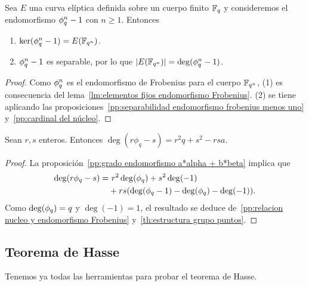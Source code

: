 \begin{proposicion}\label{pp:relacion nucleo y endomorfismo Frobenius}
	Sea $E$ una curva elíptica definida sobre un cuerpo finito $\mathbb{F}_q$ y consideremos el endomorfismo $\phi_q^n - 1$ con $n \ge 1$. Entonces
	\begin{enumerate}
		\item $\ker(\phi_q^n - 1) = E(\mathbb{F}_{q^n})$.
		\item $\phi_q^n - 1$ es separable, por lo que $\left\vert{E(\mathbb{F}_{q^n})}\right\vert = \deg(\phi_q^n - 1)$.
	\end{enumerate}
\end{proposicion}
\begin{proof}
Como $\phi_q^n$ es el endomorfismo de Frobenius para el cuerpo $\mathbb{F}_{q^n}$, (1) es consecuencia del lema~\ref{lm:elementos fijos endomorfismo Frobenius}. (2) se tiene aplicando las proposiciones~\ref{pp:separabilidad endomorfismo frobenius menos uno} y~\ref{pp:cardinal del núcleo}.
\end{proof}

\begin{lema}\label{lm:descomposicion grado frobenius}
	Sean $r, s$ enteros. Entonces $\deg(r \phi_q - s) = r^2 q + s^2 - rsa$.
\end{lema}
\begin{proof}
La proposición~\ref{pp:grado endomorfismo a*alpha + b*beta} implica que
\begin{align*}
	\deg(r \phi_q - s) =& \ r^2 \deg(\phi_q) + s^2 \deg(-1) \\
	&+ r s (\deg(\phi_q - 1) - \deg(\phi_q) - \deg(-1)).
\end{align*}
Como $\deg(\phi_q) = q$ y $\deg(-1) = 1$, el resultado se deduce de~\ref{pp:relacion nucleo y endomorfismo Frobenius} y~\ref{th:estructura grupo puntos}.
\end{proof}

\subsection{Teorema de Hasse}
\label{sub:Teorema de Hasse}

Tenemos ya todas las herramientas para probar el teorema de Hasse.

